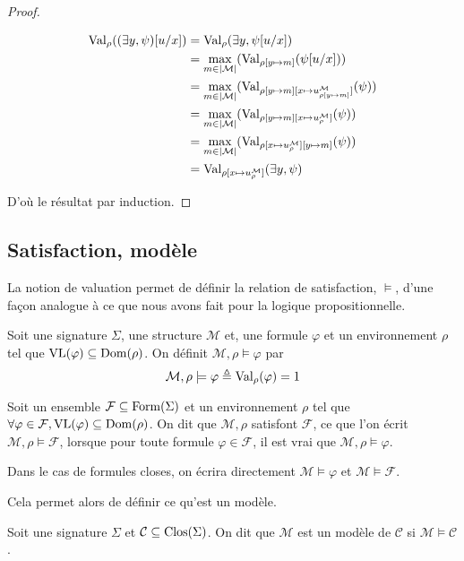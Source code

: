 \begin{proof}
\begin{itemize}
\begin{align*}
      \operatorname{Val}_\rho((\exists y,\psi)[u/x]) &= \operatorname{Val}_\rho(\exists y,\psi[u/x])\\
      &= \max_{m\in|\mathcal M|}(\operatorname{Val}_{\rho[y \mapsto m]}(\psi[u/x]))\\
      &= \max_{m\in|\mathcal M|}(\operatorname{Val}_{\rho[y\mapsto m]
        [x\mapsto u^\mathcal M_{\rho[y\mapsto m]}]}(\psi))\\
      &= \max_{m\in|\mathcal M|}(\operatorname{Val}_{\rho[y\mapsto m][x\mapsto u^\mathcal M_\rho]}(\psi))\\
      &= \max_{m\in|\mathcal M|}(\operatorname{Val}_{\rho[x\mapsto u^\mathcal M_\rho][y\mapsto m]}(\psi))\\
      &= \operatorname{Val}_{\rho[x\mapsto u^\mathcal M_\rho]}(\exists y, \psi)
    \end{align*}
  \end{itemize}
  D'où le résultat par induction.
\end{proof}

\subsection{Satisfaction, modèle}

La notion de valuation permet de définir la relation de satisfaction, $\models$,
d'une façon analogue à ce que nous avons fait pour la logique propositionnelle.

\begin{definition}[Satisfaction]
  Soit une signature $\Sigma$, une structure $\mathcal M$ et, une formule
  $\varphi$ et un environnement $\rho$ tel que
  $\operatorname{VL}(\varphi)\subseteq\operatorname{Dom}(\rho)$.
  On définit $\mathcal M,\rho\models \varphi$ par
  \[\mathcal M,\rho\models \varphi \triangleq \operatorname{Val}_\rho(\varphi) = 1\]

  Soit un ensemble $\mathcal F\subseteq\operatorname{Form}(\Sigma)$ et un environnement
  $\rho$ tel que
  $\forall \varphi\in\mathcal F, \operatorname{VL}(\varphi)\subseteq\operatorname{Dom}(\rho)$.
  On dit que $\mathcal M,\rho$ satisfont $\mathcal F$, ce que l'on écrit
  $\mathcal M,\rho\models\mathcal F$, lorsque pour toute formule
  $\varphi\in\mathcal F$, il est vrai que $\mathcal M,\rho\models \varphi$.

  Dans le cas de formules closes, on écrira directement
  $\mathcal M\models\varphi$ et $\mathcal M\models \mathcal F$.
\end{definition}

Cela permet alors de définir ce qu'est un modèle.

\begin{definition}[Modèle]
  Soit une signature $\Sigma$ et $\mathcal C\subseteq\operatorname{Clos}(\Sigma)$. On dit que
  $\mathcal M$ est un modèle de $\mathcal C$ si $\mathcal M\models \mathcal C$.
\end{definition}

